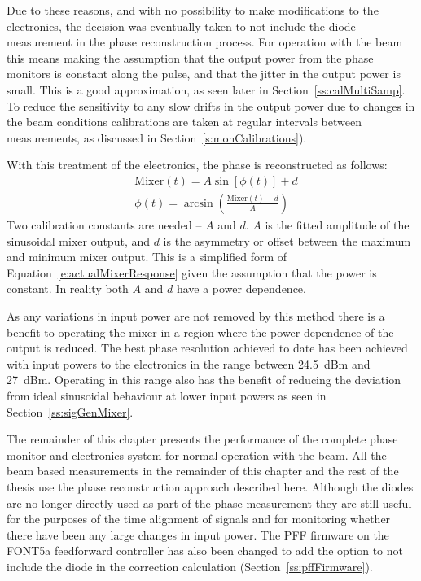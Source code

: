 Due to these reasons, and with no possibility to make modifications to the electronics, the decision was eventually taken to not include the diode measurement in the phase reconstruction process. For operation with the beam this means making the assumption that the output power from the phase monitors is constant along the pulse, and that the jitter in the output power is small. This is a good approximation, as seen later in Section~\ref{ss:calMultiSamp}. To reduce the sensitivity to any slow drifts in the output power due to changes in the beam conditions calibrations are taken at regular intervals between measurements, as discussed in Section~\ref{s:monCalibrations}).

With this treatment of the electronics, the phase is reconstructed as follows:
\begin{align}
&\mathrm{Mixer}(t) = A\sin[\phi(t)] + d \\
&\phi(t) = \arcsin\left(\frac{\mathrm{Mixer}(t)-d}{A}\right)
\label{e:phaseRecUsed}
\end{align}
Two calibration constants are needed -- \(A\) and \(d\). \(A\) is the fitted amplitude of the sinusoidal mixer output, and \(d\) is the asymmetry or offset between the maximum and minimum mixer output. This is a simplified form of Equation~\ref{e:actualMixerResponse} given the assumption that the power is constant. In reality both \(A\) and \(d\) have a power dependence.

As any variations in input power are not removed by this method there is a benefit to operating the mixer in a region where the power dependence of the output is reduced. The best phase resolution achieved to date has been achieved with input powers to the electronics in the range between 24.5~dBm and 27~dBm. Operating in this range also has the benefit of reducing the deviation from ideal sinusoidal behaviour at lower input powers as seen in Section~\ref{ss:sigGenMixer}.

The remainder of this chapter presents the performance of the complete phase monitor and electronics system for normal operation with the beam. All the beam based measurements in the remainder of this chapter and the rest of the thesis use the phase reconstruction approach described here. Although the diodes are no longer directly used as part of the phase measurement they are still useful for the purposes of the time alignment of signals and for monitoring whether there have been any large changes in input power. The PFF firmware on the FONT5a feedforward controller has also been changed to add the option to not include the diode in the correction calculation (Section~\ref{ss:pffFirmware}). %

